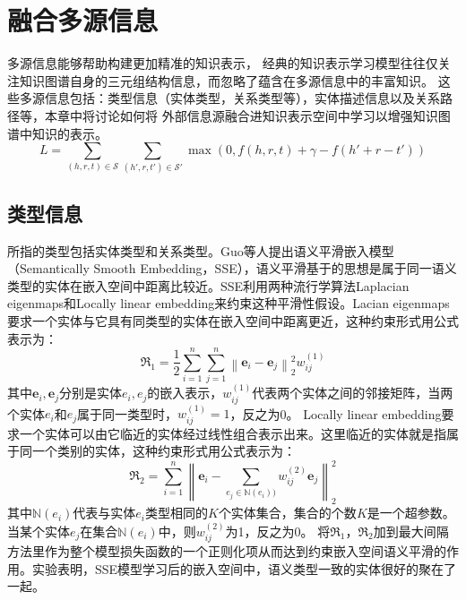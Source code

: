 \documentclass[twocolumn]{article}
\author{\zihao{-4} \songti xxx}
\date{}
\begin{document}
	\section{融合多源信息}
	多源信息能够帮助构建更加精准的知识表示，
	经典的知识表示学习模型往往仅关注知识图谱自身的三元组结构信息，而忽略了蕴含在多源信息中的丰富知识。
	这些多源信息包括：类型信息（实体类型，关系类型等），实体描述信息以及关系路径等，本章中将讨论如何将
	外部信息源融合进知识表示空间中学习以增强知识图谱中知识的表示。
	\begin{equation}
		L=\sum_{(h,r,t)\in \mathcal{S}}\sum_{(h',r,t')\in \mathcal{S}'}\max (0,f(h,r,t)+\gamma-f(h'+r-t'))
	\end{equation}
	\subsection{类型信息}
	所指的类型包括实体类型和关系类型。Guo等人\cite{SSE}提出语义平滑嵌入模型（Semantically Smooth Embedding，SSE），语义平滑基于的思想是属于同一语义类型的实体在嵌入空间中距离比较近。SSE利用两种流行学算法Laplacian eigenmaps和Locally linear embedding来约束这种平滑性假设。Lacian eigenmaps要求一个实体与它具有同类型的实体在嵌入空间中距离更近，这种约束形式用公式表示为：
	\begin{equation}
		\Re_1 =\frac{1}{2}\sum_{i=1}^{n}\sum_{j=1}^{n}\left \| \textbf{e}_i-\textbf{e}_j \right \|_2^2w_{ij}^{(1)}
	\end{equation}
	其中$\textbf{e}_i,\textbf{e}_j$分别是实体$e_i,e_j$的嵌入表示，$w_{ij}^{(1)}$代表两个实体之间的邻接矩阵，当两个实体$e_i$和$e_j$属于同一类型时，$w_{ij}^{(1)}=1$，反之为0。
	Locally linear embedding要求一个实体可以由它临近的实体经过线性组合表示出来。这里临近的实体就是指属于同一个类别的实体，这种约束形式用公式表示为：
	\begin{equation}
	\Re_2=\sum_{i=1}^{n}\left \| \textbf{e}_i-\sum _{e_j\in \mathbb{N}(e_i))}w_{ij}^{(2)}\textbf{e}_j \right \|_2^2
	\end{equation}
	其中$\mathbb{N}(e_i)$代表与实体$e_i$类型相同的$K$个实体集合，集合的个数$K$是一个超参数。
	当某个实体$e_j$在集合$\mathbb{N}(e_i)$中，则$w_{ij}^{(2)}$为1，反之为0。
	将$\Re_1，\Re_2$加到最大间隔方法里作为整个模型损失函数的一个正则化项从而达到约束嵌入空间语义平滑的作用。实验表明，SSE模型学习后的嵌入空间中，语义类型一致的实体很好的聚在了一起。
	
\end{document}
